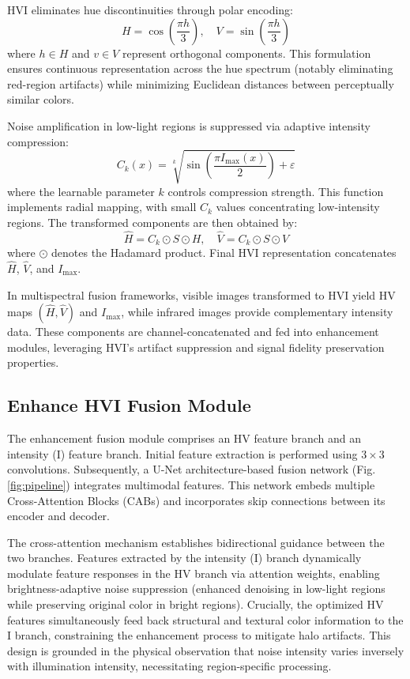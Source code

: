 \documentclass[journal]{IEEEtran}
\begin{document}
HVI eliminates hue discontinuities through polar encoding:
\begin{equation}
H = \cos\left(\frac{\pi h}{3}\right), \quad 
V = \sin\left(\frac{\pi h}{3}\right)
\end{equation}
where $h \in H$ and $v \in V$ represent orthogonal components. This formulation ensures continuous representation across the hue spectrum (notably eliminating red-region artifacts) while minimizing Euclidean distances between perceptually similar colors.

Noise amplification in low-light regions is suppressed via adaptive intensity compression:
\begin{equation}
C_k(x) = \sqrt[k]{\sin\left(\frac{\pi I_{\text{max}}(x)}{2}\right) + \varepsilon}
\end{equation}
where the learnable parameter $k$ controls compression strength. This function implements radial mapping, with small $C_k$ values concentrating low-intensity regions. The transformed components are then obtained by:
\begin{equation}
\hat{H} = C_k \odot S \odot H, \quad \hat{V} =  C_k \odot S \odot V
\end{equation}
where $\odot$ denotes the Hadamard product. Final HVI representation concatenates $\hat{H}$, $\hat{V}$, and $I_{\text{max}}$.

In multispectral fusion frameworks, visible images transformed to HVI yield HV maps $(\hat{H},\hat{V})$ and $I_{\text{max}}$, while infrared images provide complementary intensity data. These components are channel-concatenated and fed into enhancement modules, leveraging HVI's artifact suppression and signal fidelity preservation properties.




\subsection{Enhance HVI Fusion Module}
\label{ssec:fusion}
The enhancement fusion module comprises an HV feature branch and an intensity (I) feature branch. Initial feature extraction is performed using $3\times3$ convolutions. Subsequently, a U-Net architecture-based fusion network (Fig. \ref{fig:pipeline}) integrates multimodal features. This network embeds multiple Cross-Attention Blocks (CABs) and incorporates skip connections between its encoder and decoder.

The cross-attention mechanism establishes bidirectional guidance between the two branches. Features extracted by the intensity (I) branch dynamically modulate feature responses in the HV branch via attention weights, enabling brightness-adaptive noise suppression (enhanced denoising in low-light regions while preserving original color in bright regions). Crucially, the optimized HV features simultaneously feed back structural and textural color information to the I branch, constraining the enhancement process to mitigate halo artifacts. This design is grounded in the physical observation that noise intensity varies inversely with illumination intensity, necessitating region-specific processing.
\end{document}
